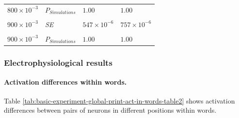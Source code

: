 \documentclass[
]{article}
\begin{document}
\begin{longtable}[t]{llll}
${800}\times 10^{-3}$ & $P_{Simulations}$ & $1.00$ & $1.00$\\
\cellcolor{gray!6}{${900}\times 10^{-3}$} & \cellcolor{gray!6}{{\em M}} & \cellcolor{gray!6}{${5.44}\times 10^{-3}$} & \cellcolor{gray!6}{${7.53}\times 10^{-3}$}\\
${900}\times 10^{-3}$ & {\em SE} & ${547}\times 10^{-6}$ & ${757}\times 10^{-6}$\\
\cellcolor{gray!6}{${900}\times 10^{-3}$} & \cellcolor{gray!6}{$p_{Wilcoxon}$} & \cellcolor{gray!6}{${3.96}\times 10^{-18}$} & \cellcolor{gray!6}{${3.96}\times 10^{-18}$}\\
\addlinespace
${900}\times 10^{-3}$ & $P_{Simulations}$ & $1.00$ & $1.00$\\*
\end{longtable}

\clearpage

\hypertarget{electrophysiological-results-1}{%
\subsubsection{Electrophysiological
results}\label{electrophysiological-results-1}}

\hypertarget{activation-differences-within-words.}{%
\paragraph{Activation differences within
words.}\label{activation-differences-within-words.}}

Table \ref{tab:basic-experiment-global-print-act-in-words-table2} shows
activation differences between pairs of neurons in different positions
within words.
\end{document}
